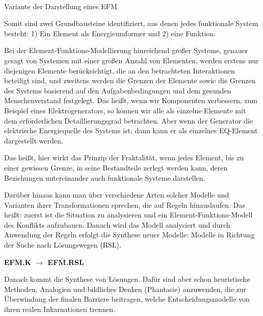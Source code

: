 \documentclass[11pt,a4paper]{article}
\begin{document}
\begin{center}
    \\ Variante der Darstellung eines EFM
\end{center}
Somit sind zwei Grundbausteine identifiziert, aus denen jedes funktionale
System besteht: 1) Ein Element als Energieumformer und 2) eine Funktion.

Bei der Element-Funktions-Modellierung hinreichend großer Systeme, genauer
gesagt von Systemen mit einer großen Anzahl von Elementen, werden erstens nur
diejenigen Elemente berücksichtigt, die an den betrachteten Interaktionen
beteiligt sind, und zweitens werden die Grenzen der Elemente sowie die Grenzen
des Systems basierend auf den Aufgabenbedingungen und dem gesunden
Menschenverstand festgelegt. Das heißt, wenn wir Komponenten verbessern, zum
Beispiel eines Elektrogenerators, so können wir alle als einzelne Elemente mit
dem erforderlichen Detaillierungsgrad betrachten. Aber wenn der Generator die
elektrische Energiequelle des Systems ist, dann kann er als einzelnes
EQ-Element dargestellt werden.

Das heißt, hier wirkt das Prinzip der Fraktalität, wenn jedes Element, bis zu
einer gewissen Grenze, in seine Bestandteile zerlegt werden kann, deren
Beziehungen untereinander auch funktionale Systeme darstellen.

Darüber hinaus kann man über verschiedene Arten solcher Modelle und Varianten
ihrer Transformationen sprechen, die auf Regeln hinauslaufen. Das heißt:
zuerst ist die Situation zu analysieren und ein Element-Funktions-Modell des
Konflikts aufzubauen. Danach wird das Modell analysiert und durch Anwendung
der Regeln erfolgt die Synthese neuer Modelle: Modelle in Richtung der Suche
nach Lösungswegen (RSL).
\begin{center}\bf   EFM.K $\to$ EFM.RSL \end{center}
Danach kommt die Synthese von Lösungen. Dafür sind aber schon heuristische
Methoden, Analogien und bildliches Denken (Phantasie) anzuwenden, die zur
Überwindung der finalen Barriere beitragen, welche Entscheidungsmodelle von
ihren realen Inkarnationen trennen.
\end{document}
